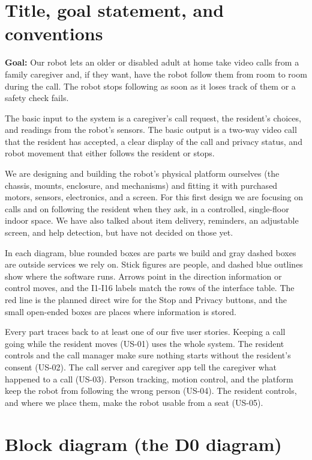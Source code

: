 \documentclass[12pt,letterpaper]{article}
\begin{document}
\setcounter{page}{1}

\section{Title, goal statement, and conventions}

\textbf{Goal:} Our robot lets an older or disabled adult at home take video calls from a family caregiver and, if they want, have the robot follow them from room to room during the call. The robot stops following as soon as it loses track of them or a safety check fails.

The basic input to the system is a caregiver's call request, the resident's choices, and readings from the robot's sensors. The basic output is a two-way video call that the resident has accepted, a clear display of the call and privacy status, and robot movement that either follows the resident or stops.

We are designing and building the robot's physical platform ourselves (the chassis, mounts, enclosure, and mechanisms) and fitting it with purchased motors, sensors, electronics, and a screen. For this first design we are focusing on calls and on following the resident when they ask, in a controlled, single-floor indoor space. We have also talked about item delivery, reminders, an adjustable screen, and help detection, but have not decided on those yet.

In each diagram, blue rounded boxes are parts we build and gray dashed boxes are outside services we rely on. Stick figures are people, and dashed blue outlines show where the software runs. Arrows point in the direction information or control moves, and the I1-I16 labels match the rows of the interface table. The red line is the planned direct wire for the Stop and Privacy buttons, and the small open-ended boxes are places where information is stored.

Every part traces back to at least one of our five user stories. Keeping a call going while the resident moves (US-01) uses the whole system. The resident controls and the call manager make sure nothing starts without the resident's consent (US-02). The call server and caregiver app tell the caregiver what happened to a call (US-03). Person tracking, motion control, and the platform keep the robot from following the wrong person (US-04). The resident controls, and where we place them, make the robot usable from a seat (US-05).

\section{Block diagram (the D0 diagram)}
\end{document}
